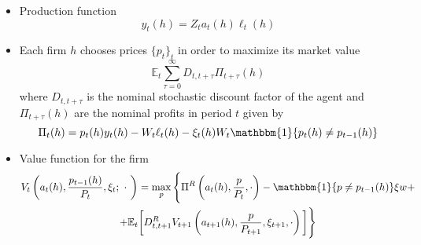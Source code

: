 \documentclass[a4paper,10pt]{article}  %
\begin{document}
\begin{itemize}
   \item Production function
   \begin{equation}
      \label{eq:model_eq1}
      y_t(h) = Z_t a_t(h) \ell_t(h)
   \end{equation}

   \item Each firm $h$ chooses prices $ \{p_t\}_{t} $ in order to maximize its market value
   \begin{equation}
      \label{eq:model_eq}
      \mathbb{E}_t \sum_{\tau=0}^{\infty} D_{t,t+\tau} \Pi_{t+\tau} (h)
   \end{equation}
   where $D_{t,t+\tau}$ is the nominal stochastic discount factor of the agent and $\Pi_{t+\tau} (h)  $
   are the nominal profits in period $ t $ given by
   \begin{equation}
      \label{eq:model_eq3}
      \Pi_t(h) = p_t(h) y_t(h) - W_t \ell_t(h) - \xi_t(h) W_t \mathbbm{1}\{p_t(h) \ne p_{t-1}(h)\}
   \end{equation}
   
   \item Value function for the firm
   \begin{multline}
      V_t \left( a_t(h), \frac{ p_{t-1}(h) }{ P_t }, \xi_t; \ \cdot \ \right) = 
      \max_{p} 
      \Bigg\{
         \Pi^R \left( a_t(h), \frac{ p }{ P_t }, \cdot \right) 
         -\mathbbm{1} \{p \ne p_{t-1}(h ) \} \xi w + \\
         + \mathbb{E}_t \bigg[ D^R_{t,t+1} V_{t+1} \left( a_{t+1}(h), \frac{ p }{ P_{t+1} }, \xi_{t+1}, \cdot \right) \bigg] \Bigg\}
   \end{multline}



\end{itemize}
\end{document}
